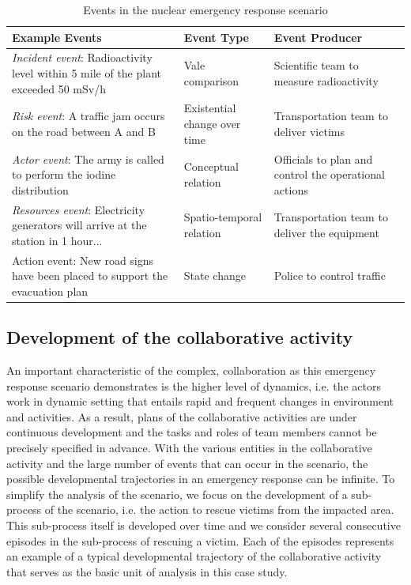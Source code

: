 \begin{table}[htbp]
\centering
\footnotesize
\begin{tabular}{>{\raggedright}p{1.8in}>{\raggedright}p{1.8in}>{\raggedright}p{1.8in}}

\toprule 
\textbf{Example Events} & \textbf{Event Type} & \textbf{Event Producer}\tabularnewline
\midrule 
\emph{Incident event}: Radioactivity level within 5 mile of the plant
exceeded 50 mSv/h & Vale comparison & Scientific team to measure radioactivity\tabularnewline
\midrule 
\emph{Risk event}: A traffic jam occurs on the road between A and
B  & Existential change over time & Transportation team to deliver victims\tabularnewline
\midrule 
\emph{Actor event}: The army is called to perform the iodine distribution & Conceptual relation & Officials to plan and control the operational actions\tabularnewline
\midrule 
\emph{Resources event}: Electricity generators will arrive at the station in 1 hour... & Spatio-temporal relation & Transportation team to deliver the equipment\tabularnewline
\midrule 
Action event: New road signs have been placed to support the evacuation
plan & State change & Police to control traffic\tabularnewline
\bottomrule

\end{tabular}	
\caption{Events in the nuclear emergency response scenario}
\label{tab:events_in_scenario}
\end{table}


\subsection{Development of the collaborative activity} %
\label{sub:event_driven_activity_development}
An important characteristic of the complex, collaboration as this emergency response scenario demonstrates is the higher level of dynamics, i.e. the actors work in dynamic setting that entails rapid and frequent changes in environment and activities. As a result, plans of the collaborative activities are under continuous development and the tasks and roles of team members cannot be precisely specified in advance. With the various entities in the collaborative activity and the large number of events that can occur in the scenario, the possible developmental trajectories in an emergency response can be infinite. To simplify the analysis of the scenario, we focus on the development of a sub-process of the scenario, i.e. the action to rescue victims from the impacted area. This sub-process itself is developed over time and we consider several consecutive episodes in the sub-process of rescuing a victim. Each of the episodes represents an example of a typical developmental trajectory of the collaborative activity that serves as the basic unit of analysis in this case study.

